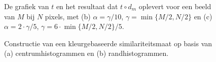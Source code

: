 \begin{figure}[bp]
\vspace{5pt}
\centering
{}
\caption{\label{fig:kwadratische_interpolatie}De grafiek van $t$ en het resultaat dat
$t \circ d_m$ oplevert voor een beeld van $M$ bij $N$ pixels, met
(b) $\alpha=\gamma / 10$, $\gamma = \min\{M/2, N/2\}$ en 
(c) $\alpha=2 \cdot \gamma / 5$, $\gamma = 6 \cdot \min\{M/2, N/2\} / 5$.}
\end{figure}

\begin{figure}[!bp]
\vspace{10pt}
\centering
{}
\qquad
{}
\caption{\label{fig:constructie_uitgebreide_histogrammen}Constructie van een kleurgebaseerde 
similariteitsmaat op basis van (a) centrumhistogrammen en (b) randhistogrammen.}
\end{figure}

